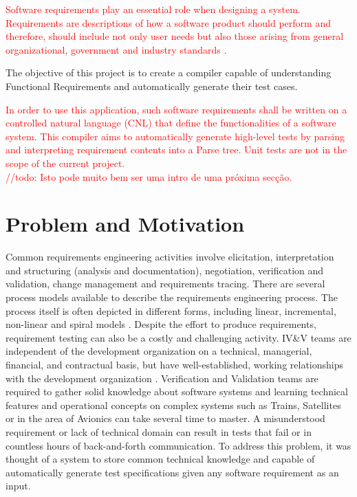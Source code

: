 
\textcolor{red}{Software requirements play an essential role when designing a system. Requirements are descriptions of how a software product should perform and therefore, should include not only user needs but also those arising from general organizational, government and industry standards \cite{aurum_engineering_2005}.}

The objective of this project is to create a compiler capable of understanding Functional Requirements and automatically generate their test cases. 

\textcolor{red}{
In order to use this application, such software requirements shall be written on a controlled natural language (CNL) that define the functionalities of a software system. This compiler aims to automatically generate high-level tests by parsing and interpreting requirement contents into a Parse tree. Unit tests are not in the scope of the current project. \\
//todo: Isto pode muito bem ser uma intro de uma próxima secção.
}

\section{Problem and Motivation}
\label{sec:problem_and_motivation}

Common requirements engineering activities involve elicitation, interpretation and
structuring (analysis and documentation), negotiation, verification and validation,
change management and requirements tracing. There are several process models
available to describe the requirements engineering process. The process itself is
often depicted in different forms, including linear, incremental, non-linear and spiral models \cite{aurum_engineering_2005}.
Despite the effort to produce requirements, requirement testing can also be a costly and challenging activity. IV\&V teams are independent of the development organization on a technical, managerial, financial, and contractual basis, but have well-established, working relationships with the development organization \cite{noauthor_independent_2013}. Verification and Validation teams are required to gather solid knowledge about software systems and learning technical features and operational concepts on complex systems such as Trains, Satellites or in the area of Avionics can take several time to master. A misunderstood requirement or lack of technical domain can result in tests that fail or in countless hours of back-and-forth communication.
To address this problem, it was thought of a system to store common technical knowledge and capable of automatically generate test specifications given any software requirement as an input.


